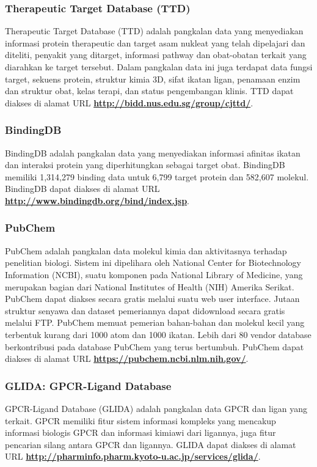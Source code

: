 		\subsubsection{Therapeutic Target Database (TTD)} \label{ttd}
		Therapeutic Target Database (TTD) adalah pangkalan data yang menyediakan informasi protein therapeutic dan target asam nukleat yang telah dipelajari dan diteliti, penyakit yang ditarget, informasi pathway dan obat-obatan terkait yang diarahkan ke target tersebut. Dalam pangkalan data ini juga terdapat data fungsi target, sekuens protein, struktur kimia 3D, sifat ikatan ligan, penamaan enzim dan struktur obat, kelas terapi, dan status pengembangan klinis. TTD dapat diakses di alamat URL \textbf{\url{http://bidd.nus.edu.sg/group/cjttd/}}.

		\subsubsection{BindingDB} \label{binding_db}
		BindingDB adalah pangkalan data yang menyediakan informasi afinitas ikatan dan interaksi protein yang diperhitungkan sebagai target obat. BindingDB memiliki 1,314,279 binding data untuk 6,799 target protein dan 582,607 molekul. BindingDB dapat diakses di alamat URL \textbf{\url{http://www.bindingdb.org/bind/index.jsp}}.

		\subsubsection{PubChem} \label{pubchem}
		PubChem adalah pangkalan data molekul kimia dan aktivitasnya terhadap penelitian biologi. Sistem ini dipelihara oleh National Center for Biotechnology Information (NCBI), suatu komponen pada National Library of Medicine, yang merupakan bagian dari National Institutes of Health (NIH) Amerika Serikat. PubChem dapat diakses secara gratis melalui suatu web user interface. Jutaan struktur senyawa dan dataset pemeriannya dapat didownload secara gratis melalui FTP. PubChem memuat pemerian bahan-bahan dan molekul kecil yang terbentuk kurang dari 1000 atom dan 1000 ikatan. Lebih dari 80 vendor database berkontribusi pada database PubChem yang terus bertumbuh. PubChem dapat diakses di alamat URL \textbf{\url{https://pubchem.ncbi.nlm.nih.gov/}}.

		\subsubsection{GLIDA: GPCR-Ligand Database} \label{glida}
		GPCR-Ligand Database (GLIDA) adalah pangkalan data GPCR dan ligan yang terkait. GPCR memiliki fitur sistem informasi kompleks yang mencakup informasi biologis GPCR dan informasi kimiawi dari ligannya, juga fitur pencarian silang antara GPCR dan ligannya. GLIDA dapat diakses di alamat URL \textbf{\url{http://pharminfo.pharm.kyoto-u.ac.jp/services/glida/}}.

